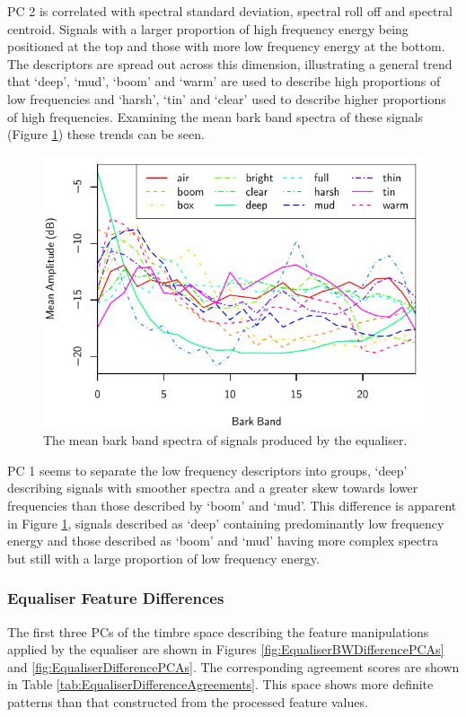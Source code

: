 			PC 2 is correlated with spectral standard deviation, spectral roll off and spectral centroid.
			Signals with a larger proportion of high frequency energy being positioned at the top and those
			with more low frequency energy at the bottom. The descriptors are spread out across this dimension,
			illustrating a general trend that `deep', `mud', `boom' and `warm' are used to describe high
			proportions of low frequencies and `harsh', `tin' and `clear' used to describe higher proportions
			of high frequencies. Examining the mean bark band spectra of these signals (Figure
			\ref{fig:EqualiserProcessedSpectra}) these trends can be seen. 

			\begin{figure}[h!]
				\centering
				\includegraphics{chapter4/Images/EqualiserProcessedSpectra.pdf}
				\caption{The mean bark band spectra of signals produced by the equaliser.}
				\label{fig:EqualiserProcessedSpectra}
			\end{figure}

			PC 1 seems to separate the low frequency descriptors into groups, `deep' describing signals with
			smoother spectra and a greater skew towards lower frequencies than those described by `boom' and
			`mud'. This difference is apparent in Figure \ref{fig:EqualiserProcessedSpectra}, signals described
			as `deep' containing predominantly low frequency energy and those described as `boom' and `mud'
			having more complex spectra but still with a large proportion of low frequency energy.

		\subsubsection*{Equaliser Feature Differences}
			The first three PCs of the timbre space describing the feature manipulations applied by the
			equaliser are shown in Figures \ref{fig:EqualiserBWDifferencePCAs} and
			\ref{fig:EqualiserDifferencePCAs}. The corresponding agreement scores are shown in Table
			\ref{tab:EqualiserDifferenceAgreements}. This space shows more definite patterns than that
			constructed from the processed feature values.

